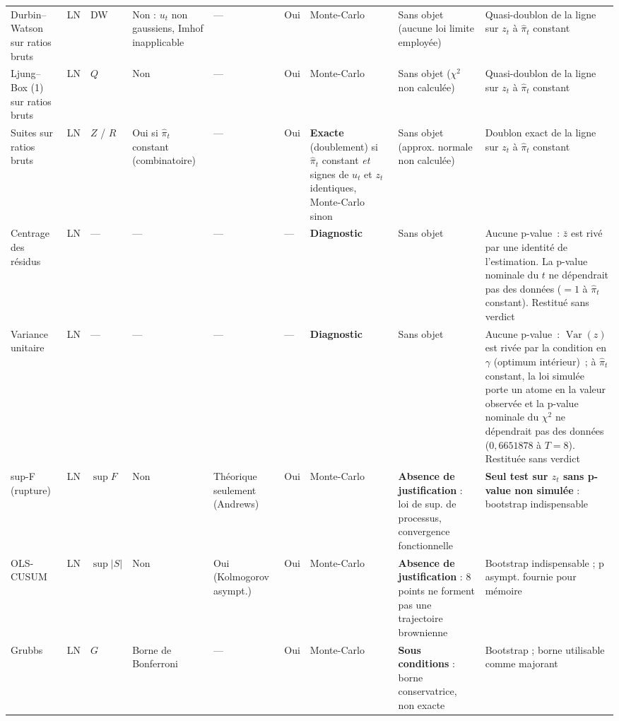\documentclass[a4paper,11pt]{article}
\begin{document}
\begin{landscape}
\begin{center}
\begin{longtable}{@{}p{2.9cm}p{1.5cm}p{1.1cm}p{1.3cm}p{1.3cm}p{1.3cm}p{2.7cm}p{4.7cm}p{4.1cm}@{}}
Durbin--Watson sur ratios bruts & LN & DW & Non : $u_t$ non gaussiens, Imhof inapplicable &
--- & Oui & Monte-Carlo & Sans objet (aucune loi limite employée) &
Quasi-doublon de la ligne sur $z_t$ à $\hat\pi_t$ constant \\

Ljung--Box (1) sur ratios bruts & LN & $Q$ & Non & --- & Oui & Monte-Carlo &
Sans objet ($\chi^2$ non calculée) &
Quasi-doublon de la ligne sur $z_t$ à $\hat\pi_t$ constant \\

Suites sur ratios bruts & LN & $Z$ / $R$ & Oui si $\hat\pi_t$ constant (combinatoire) & --- &
Oui & \textbf{Exacte} (doublement) si $\hat\pi_t$ constant \emph{et} signes de $u_t$ et $z_t$
identiques, Monte-Carlo sinon & Sans objet (approx. normale non calculée) &
Doublon exact de la ligne sur $z_t$ à $\hat\pi_t$ constant \\

Centrage des résidus & LN & --- & --- & --- & --- &
\textbf{Diagnostic} & Sans objet & Aucune p-value~: $\bar z$ est rivé par une
identité de l'estimation. La p-value nominale du $t$ ne dépendrait pas des
données ($=1$ à $\hat\pi_t$ constant). Restitué sans verdict \\

Variance unitaire & LN & --- & --- & --- & --- &
\textbf{Diagnostic} & Sans objet & Aucune p-value~: $\operatorname{Var}(z)$ est
rivée par la condition en $\gamma$ (optimum intérieur)~; à $\hat\pi_t$
constant, la loi simulée porte un atome en la valeur observée et la p-value
nominale du $\chi^2$ ne dépendrait pas des données ($0{,}6651878$ à $T = 8$).
Restituée sans verdict \\

sup-F (rupture) & LN & $\sup F$ & Non & Théorique seulement (Andrews) & Oui & Monte-Carlo &
\textbf{Absence de justification} : loi de sup. de processus, convergence fonctionnelle &
\textbf{Seul test sur $z_t$ sans p-value non simulée} : bootstrap indispensable \\

OLS-CUSUM & LN & $\sup|S|$ & Non & Oui (Kolmogorov asympt.) & Oui & Monte-Carlo &
\textbf{Absence de justification} : 8 points ne forment pas une trajectoire
brownienne & Bootstrap indispensable ; p asympt. fournie pour mémoire \\

Grubbs & LN & $G$ & Borne de Bonferroni & --- & Oui & Monte-Carlo &
\textbf{Sous conditions} : borne conservatrice, non exacte &
Bootstrap ; borne utilisable comme majorant \\


\end{longtable}
\end{center}
\end{landscape}
\end{document}
